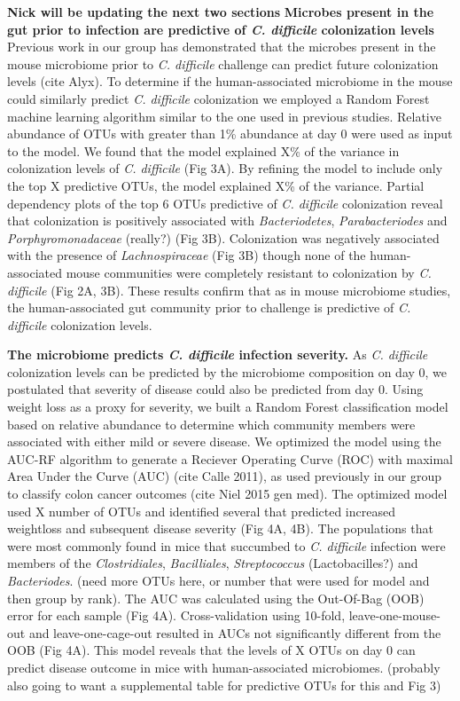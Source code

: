 \documentclass[11pt,]{article}
\begin{document}
\textbf{Nick will be updating the next two sections} \textbf{Microbes
present in the gut prior to infection are predictive of \emph{C.
difficile} colonization levels} Previous work in our group has
demonstrated that the microbes present in the mouse microbiome prior to
\emph{C. difficile} challenge can predict future colonization levels
(cite Alyx). To determine if the human-associated microbiome in the
mouse could similarly predict \emph{C. difficile} colonization we
employed a Random Forest machine learning algorithm similar to the one
used in previous studies. Relative abundance of OTUs with greater than
1\% abundance at day 0 were used as input to the model. We found that
the model explained X\% of the variance in colonization levels of
\emph{C. difficile} (Fig 3A). By refining the model to include only the
top X predictive OTUs, the model explained X\% of the variance. Partial
dependency plots of the top 6 OTUs predictive of \emph{C. difficile}
colonization reveal that colonization is positively associated with
\emph{Bacteriodetes}, \emph{Parabacteriodes} and
\emph{Porphyromonadaceae} (really?) (Fig 3B). Colonization was
negatively associated with the presence of \emph{Lachnospiraceae} (Fig
3B) though none of the human-associated mouse communities were
completely resistant to colonization by \emph{C. difficile} (Fig 2A,
3B). These results confirm that as in mouse microbiome studies, the
human-associated gut community prior to challenge is predictive of
\emph{C. difficile} colonization levels.

\textbf{The microbiome predicts \emph{C. difficile} infection severity.}
As \emph{C. difficile} colonization levels can be predicted by the
microbiome composition on day 0, we postulated that severity of disease
could also be predicted from day 0. Using weight loss as a proxy for
severity, we built a Random Forest classification model based on
relative abundance to determine which community members were associated
with either mild or severe disease. We optimized the model using the
AUC-RF algorithm to generate a Reciever Operating Curve (ROC) with
maximal Area Under the Curve (AUC) (cite Calle 2011), as used previously
in our group to classify colon cancer outcomes (cite Niel 2015 gen med).
The optimized model used X number of OTUs and identified several that
predicted increased weightloss and subsequent disease severity (Fig 4A,
4B). The populations that were most commonly found in mice that
succumbed to \emph{C. difficile} infection were members of the
\emph{Clostridiales}, \emph{Bacilliales}, \emph{Streptococcus}
(Lactobacilles?) and \emph{Bacteriodes}. (need more OTUs here, or number
that were used for model and then group by rank). The AUC was calculated
using the Out-Of-Bag (OOB) error for each sample (Fig 4A).
Cross-validation using 10-fold, leave-one-mouse-out and
leave-one-cage-out resulted in AUCs not significantly different from the
OOB (Fig 4A). This model reveals that the levels of X OTUs on day 0 can
predict disease outcome in mice with human-associated microbiomes.
(probably also going to want a supplemental table for predictive OTUs
for this and Fig 3)
\end{document}
